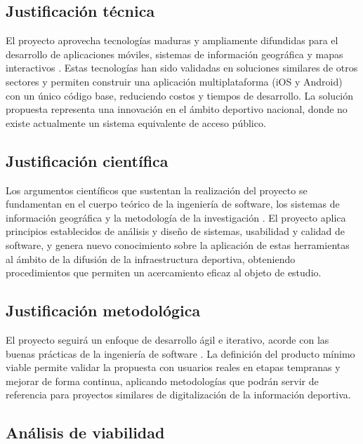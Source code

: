 \subsection{Justificaci\'on t\'ecnica}

El proyecto aprovecha tecnolog\'ias maduras y ampliamente difundidas para el
desarrollo de aplicaciones m\'oviles, sistemas de informaci\'on geogr\'afica
y mapas interactivos \citep{longley2015, pressman2010}. Estas tecnolog\'ias han
sido validadas en soluciones similares de otros sectores y permiten construir
una aplicaci\'on multiplataforma (iOS y Android) con un \'unico c\'odigo base,
reduciendo costos y tiempos de desarrollo. La soluci\'on propuesta representa
una innovaci\'on en el \'ambito deportivo nacional, donde no existe actualmente un
sistema equivalente de acceso p\'ublico.

\subsection{Justificaci\'on cient\'ifica}

Los argumentos cient\'ificos que sustentan la realizaci\'on del proyecto se
fundamentan en el cuerpo te\'orico de la ingenier\'ia de software, los sistemas
de informaci\'on geogr\'afica y la metodolog\'ia de la investigaci\'on
\citep{sommerville2011, longley2015, hernandez2014}. El proyecto aplica
principios establecidos de an\'alisis y dise\~no de sistemas, usabilidad y
calidad de software, y genera nuevo conocimiento sobre la aplicaci\'on de estas
herramientas al \'ambito de la difusi\'on de la infraestructura deportiva,
obteniendo procedimientos que permiten un acercamiento eficaz al objeto de
estudio.

\subsection{Justificaci\'on metodol\'ogica}

El proyecto seguir\'a un enfoque de desarrollo \'agil e iterativo, acorde con las
buenas pr\'acticas de la ingenier\'ia de software \citep{sommerville2011,
larman2004}. La definici\'on del producto m\'inimo viable permite validar la
propuesta con usuarios reales en etapas tempranas y mejorar de forma
continua, aplicando metodolog\'ias que podr\'an servir de referencia para
proyectos similares de digitalizaci\'on de la informaci\'on deportiva.

\subsection{An\'alisis de viabilidad}

